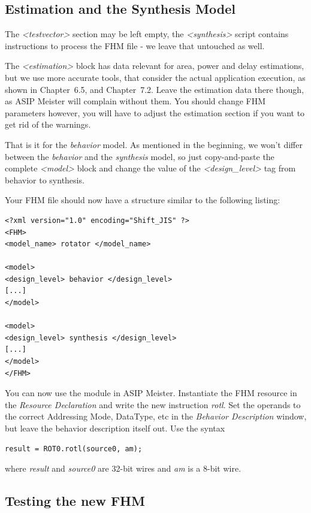 \hypertarget{estimation-and-the-synthesis-model}{%
\subsection{Estimation and the Synthesis
Model}\label{estimation-and-the-synthesis-model}}

The \emph{\textless testvector\textgreater{}} section may be left empty,
the \emph{\textless synthesis\textgreater{}} script contains
instructions to process the FHM file - we leave that untouched as well.

The \emph{\textless estimation\textgreater{}} block has data relevant
for area, power and delay estimations, but we use more accurate tools,
that consider the actual application execution, as shown in Chapter~6.5,
and Chapter~7.2. Leave the estimation data there though, as ASIP Meister
will complain without them. You should change FHM parameters however,
you will have to adjust the estimation section if you want to get rid of
the warnings.

That is it for the \emph{behavior} model. As mentioned in the beginning,
we won't differ between the \emph{behavior} and the \emph{synthesis}
model, so just copy-and-paste the complete
\emph{\textless model\textgreater{}} block and change the value of the
\emph{\textless design\_level\textgreater{}} tag from behavior to
synthesis.

Your FHM file should now have a structure similar to the following
listing:
\begin{lstlisting}
<?xml version="1.0" encoding="Shift_JIS" ?>
<FHM>
<model_name> rotator </model_name>

<model>
<design_level> behavior </design_level>
[...]
</model>

<model>
<design_level> synthesis </design_level>
[...]
</model>
</FHM>
\end{lstlisting}
You can now use the module in ASIP Meister. Instantiate the FHM resource
in the \emph{Resource Declaration} and write the new instruction
\emph{rotl}. Set the operands to the correct Addressing Mode, DataType,
etc in the \emph{Behavior Description} window, but leave the behavior
description itself out. Use the syntax
\begin{lstlisting}
result = ROT0.rotl(source0, am);
\end{lstlisting}
where \emph{result} and \emph{source0} are 32-bit wires and \emph{am} is
a 8-bit wire.

\hypertarget{testing-the-new-fhm}{%
\subsection{Testing the new FHM}\label{testing-the-new-fhm}}


